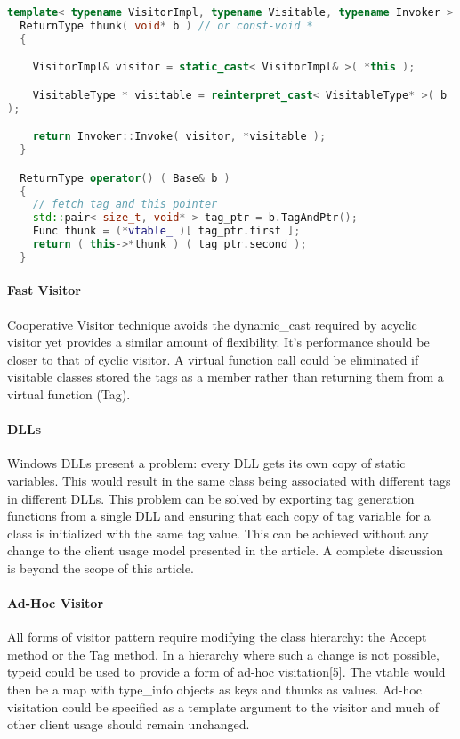 \documentclass{book}
\begin{document}
\begin{lstlisting}[caption={visitor pattern sample code 5, commandexample.cpp},language=C++]
  template< typename VisitorImpl, typename Visitable, typename Invoker >
  ReturnType thunk( void* b ) // or const-void *
  {

    VisitorImpl& visitor = static_cast< VisitorImpl& >( *this ); 

    VisitableType * visitable = reinterpret_cast< VisitableType* >( b 
);

    return Invoker::Invoke( visitor, *visitable );
  }

  ReturnType operator() ( Base& b )
  {
    // fetch tag and this pointer
    std::pair< size_t, void* > tag_ptr = b.TagAndPtr();
    Func thunk = (*vtable_ )[ tag_ptr.first ]; 
    return ( this->*thunk ) ( tag_ptr.second );
  }
\end{lstlisting}
\paragraph{Fast Visitor}

Cooperative Visitor technique avoids the dynamic\_cast required by acyclic visitor yet provides a similar amount of flexibility.
It's performance should be closer to that of cyclic visitor.
A virtual function call could be eliminated if visitable classes stored the tags as a member rather than returning them from a virtual function (Tag).
\paragraph{DLLs}

Windows DLLs present a problem: every DLL gets its own copy of static variables.
This would result in the same class being associated with different tags in different DLLs.
This problem can be solved by exporting tag generation functions from a single DLL and ensuring that each copy of tag variable for a class is initialized with the same tag value.
This can be achieved without any change to the client usage model presented in the article. A complete discussion is beyond the scope of this article.
\paragraph{Ad-Hoc Visitor}

All forms of visitor pattern require modifying the class hierarchy: the Accept method or the Tag method.
In a hierarchy where such a change is not possible, typeid could be used to provide a form of ad-hoc visitation[5].
The vtable would then be a map with type\_info objects as keys and thunks as values.
Ad-hoc visitation could be specified as a template argument to the visitor and much of other client usage should remain unchanged.
\end{document}
